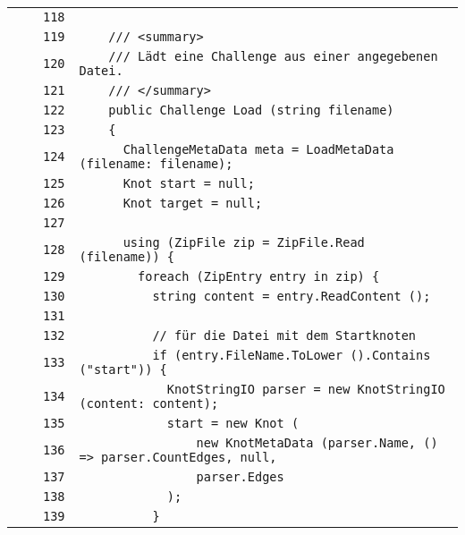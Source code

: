 \documentclass[a4paper,10pt]{article}
\begin{document}
\begin{longtable}[l]{lrrl}
\cellcolor{gray} &  & \verb~118~ & \verb~~\\
\cellcolor{gray} &  & \verb~119~ & \verb~    /// <summary>~\\
\cellcolor{gray} &  & \verb~120~ & \verb~    /// Lädt eine Challenge aus einer angegebenen Datei.~\\
\cellcolor{gray} &  & \verb~121~ & \verb~    /// </summary>~\\
\cellcolor{gray} &  & \verb~122~ & \verb~    public Challenge Load (string filename)~\\
\cellcolor{gray} &  & \verb~123~ & \verb~    {~\\
\cellcolor{gray} &  & \verb~124~ & \verb~      ChallengeMetaData meta = LoadMetaData (filename: filename);~\\
\cellcolor{gray} &  & \verb~125~ & \verb~      Knot start = null;~\\
\cellcolor{gray} &  & \verb~126~ & \verb~      Knot target = null;~\\
\cellcolor{gray} &  & \verb~127~ & \verb~~\\
\cellcolor{gray} &  & \verb~128~ & \verb~      using (ZipFile zip = ZipFile.Read (filename)) {~\\
\cellcolor{gray} &  & \verb~129~ & \verb~        foreach (ZipEntry entry in zip) {~\\
\cellcolor{gray} &  & \verb~130~ & \verb~          string content = entry.ReadContent ();~\\
\cellcolor{gray} &  & \verb~131~ & \verb~~\\
\cellcolor{gray} &  & \verb~132~ & \verb~          // für die Datei mit dem Startknoten~\\
\cellcolor{gray} &  & \verb~133~ & \verb~          if (entry.FileName.ToLower ().Contains ("start")) {~\\
\cellcolor{gray} &  & \verb~134~ & \verb~            KnotStringIO parser = new KnotStringIO (content: content);~\\
\cellcolor{gray} &  & \verb~135~ & \verb~            start = new Knot (~\\
\cellcolor{gray} &  & \verb~136~ & \verb~                new KnotMetaData (parser.Name, () => parser.CountEdges, null, ~\\
\cellcolor{gray} &  & \verb~137~ & \verb~                parser.Edges~\\
\cellcolor{gray} &  & \verb~138~ & \verb~            );~\\
\cellcolor{gray} &  & \verb~139~ & \verb~          }~\\

\end{longtable}
\end{document}
